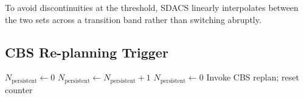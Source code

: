 \documentclass[letterpaper, 10pt, conference]{ieeeconf}
\begin{document}
To avoid discontinuities at the threshold, SDACS linearly interpolates
between the two sets across a transition band rather than switching
abruptly.

\subsection{CBS Re-planning Trigger}

\begin{algorithm}
\caption{CBS Re-planning Trigger}
\begin{algorithmic}
\STATE $N_{\text{persistent}} \leftarrow 0$
        \STATE $N_{\text{persistent}} \leftarrow N_{\text{persistent}} + 1$
    \ELSE
        \STATE $N_{\text{persistent}} \leftarrow 0$
    \ENDIF
        \STATE Invoke CBS replan; reset counter
    \ENDIF
\ENDWHILE
\end{algorithmic}
\end{algorithm}





\end{document}
